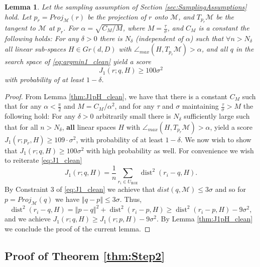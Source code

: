 \documentclass[12pt]{article}
\newtheorem{Lemma}[Theorem]{Lemma}
\theoremstyle{remark}
\newcommand{\MM}{\mathcal{M}}
\newcommand{\norm}[1]{\left\Vert #1 \right\Vert}
\newcommand{\dist}{\operatorname{dist}}
\newcommand{\sM}{{M}}
\begin{document}
\begin{Lemma}\label{lem:J_1qH_clean}
	Let the sampling assumption of Section \ref{sec:SamplingAssumptions} hold. Let ${p_r} = Proj_\MM(r)$ be the projection of $r$ onto $\MM$, and $ T_{p_r}\MM $ be the tangent to $ \MM $ at $ {p_r} $.
	For $\alpha = \sqrt{C_\sM/M}$, where $M = \frac{\tau}{\sigma}$, and $C_\sM$ is a constant  the following holds:
	For any $\delta >0$ there is $N_\delta$ (independent of $\alpha$) such that $\forall n > N_\delta$ all linear sub-spaces $H \in Gr(d,D)$ with $\angle_{max}(H,T_{{p_r}}\MM) > \alpha$, and all $q$ in the search space of \eqref{eq:argmin1_clean} yield a score 
	\[
	J_1(r; {q}, H) \geq 100\sigma^2 
	\]
	with probability of at least $1 - \delta$. 
\end{Lemma}
\begin{proof}
	From Lemma \ref{thm:J1pH_clean}, we have that there is a constant $C_\sM$ such that for any $ {\alpha} < \frac{\pi}{2} $ and $M = C_\sM/\alpha^2$, and for any $\tau$ and $\sigma$ maintaining $\frac{\tau}{\sigma}>M$
	the following hold:
	For any $\delta >0$ arbitrarily small there is $ N_\delta $ sufficiently large such that for all $ n>N_\delta $, \textbf{all} linear spaces $H$ with $\angle_{max}(H,T_{p_r}\MM) > \alpha$, yield a score $J_1(r; p_r, H) \geq 109 \cdot \sigma^2 $, with probability of at least $1 - \delta$. 
	We now wish to show that $J_1(r; q, H) \geq 100 \sigma^2$ with high probability as well.
	For convenience we wish to reiterate \eqref{eq:J1_clean}
	\[
	J_1(r; q, H) = \frac{1}{n}\sum_{r_i\in U_{\textrm{ROI}}} \dist^2 (r_i - q,H)
	.\]
	By Constraint 3 of \eqref{eq:J1_clean} we achieve that $dist(q, \MM) \leq 3\sigma$ and so for $p=Proj_\MM(q)$ we have
	$
	\norm{q - p} \leq 3\sigma
	$.
	Thus,
	\[
	\dist^2 (r_i - q,H) = \norm{p - q}^2 + \dist^2 (r_i - p,H) \geq \dist^2 (r_i - p,H) - 9\sigma^2
	,\]
	and we achieve
	$
	J_1(r; q, H) \geq J_1(r; p, H) - 9\sigma^2
	$.
	By Lemma \ref{thm:J1pH_clean} we conclude the proof of the current lemma.
\end{proof}



\subsection{Proof of Theorem \ref{thm:Step2}}
\label{sec:Step2Analysis}


\begin{figure}[omitted: a diagram of this paper's results, not reproduced here]\label{tikz:thm33_lemmas}\end{figure}
\end{document}
